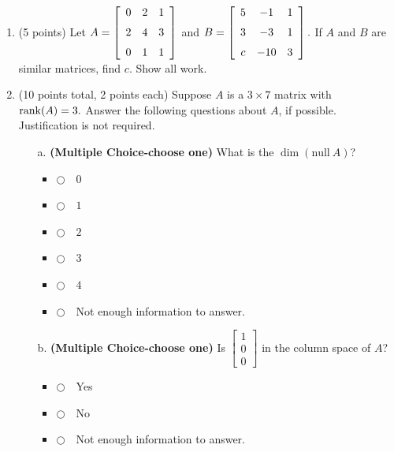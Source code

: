 \documentclass[12pt]{extarticle}
\newcommand{\chooseone}{{\Large$\Circle$\ \ }}
\begin{document}
\begin{enumerate}
\begin{itemize}
    \vfill

    \vspace{2in}
\end{itemize}
 
    \newpage
    \item (5 points) Let $A=\left[ \begin {array}{ccc} 0&2&1\\ \noalign{\medskip}2&4&3
\\ \noalign{\medskip}0&1&1\end {array} \right]$ and $B=\left[ \begin {array}{ccc} 5&-1&1\\ \noalign{\medskip}3&-3&1
\\ \noalign{\medskip}c&-10&3\end {array} \right].$ If $A$ and $B$ are similar matrices, find $c$. Show all work.
 
 \newpage


\item (10 points total, 2 points each) Suppose $A$ is a $3\times 7$ matrix with $\operatorname{rank}(A)=3.$ Answer the following questions about $A$, if possible. Justification is not required.



\begin{itemize}
   \item[a.]  \textbf{(Multiple Choice-choose one)} What is the $\dim(\text{null}\ A)$?
\begin{itemize}[label={}]
\item \chooseone $0$
\item \chooseone $1$
\item \chooseone $2$
\item \chooseone $3$
\item \chooseone $4$
\item \chooseone Not enough information to answer.
\end{itemize}    


     \vfill

     \item[b.] \textbf{(Multiple Choice-choose one)}  Is $\begin{bmatrix} 1 \\ 0 \\ 0\end{bmatrix}$ in the column space of $A$?
\begin{itemize}[label={}]
\item \chooseone Yes
\item \chooseone No
\item \chooseone Not enough information to answer.
\end{itemize}  
     \vfill


\end{itemize}
\end{enumerate}
\end{document}
